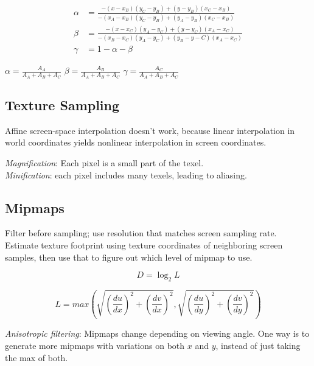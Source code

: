 \documentclass[10pt,landscape]{article}
\begin{document}
\begin{multicols}{3}
\begin{multicols}{3}
\end{multicols}

\begin{align*}
    \alpha &= \frac{-(x - x_B)(y_C - y_B) + (y - y_B)(x_C - x_B)}{-(x_A - x_B)(y_C - y_B) + (y_A - y_B)(x_C - x_B)} \\
    \beta &= \frac{-(x - x_C)(y_A - y_C) + (y - y_C)(x_A - x_C)}{-(x_B - x_C)(y_A - y_C) + (y_B - y-C)(x_A - x_C)} \\
    \gamma &= 1 - \alpha - \beta
\end{align*}

\begin{multicols}{3}
    $\alpha = \frac{A_A}{A_A + A_B + A_C}$
    \columnbreak
    $\beta = \frac{A_B}{A_A + A_B + A_C}$
    \columnbreak
    $\gamma = \frac{A_C}{A_A + A_B + A_C}$
\end{multicols}

\subsection{Texture Sampling}

Affine screen-space interpolation doesn't work, because linear interpolation in world coordinates yields nonlinear interpolation in screen coordinates.

\textit{Magnification}: Each pixel is a small part of the texel. \\ \textit{Minification}: each pixel includes many texels, leading to aliasing.

\subsection{Mipmaps}

Filter before sampling; use resolution that matches screen sampling rate. Estimate texture footprint using texture coordinates of neighboring screen samples, then use that to figure out which level of mipmap to use.

$$D = \log_2 L$$

$$L = max\left(\sqrt{\left(\frac{du}{dx}\right)^2 + \left(\frac{dv}{dx}\right)^2}, \sqrt{\left(\frac{du}{dy}\right)^2 + \left(\frac{dv}{dy}\right)^2}\right)$$

\textit{Anisotropic filtering}: Mipmaps change depending on viewing angle. One way is to generate more mipmaps with variations on both $x$ and $y$, instead of just taking the max of both.



\end{multicols}
\end{document}

